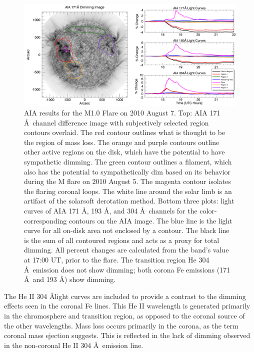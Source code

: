 \begin{figure}[!h]
	\caption[AIA contour analysis for 2010 August 7 event]{
        AIA results for the M1.0 Flare on 2010 August 7. Top: AIA 171 \AA\ channel difference image with subjectively 
        selected region contours overlaid. The red contour outlines what is thought to be the region of mass loss. The 
        orange and purple contours outline other active regions on the disk, which have the potential to have sympathetic 
        dimming. The green contour outlines a filament, which also has the potential to sympathetically dim based on its 
        behavior during the M flare on 2010 August 5. The magenta contour isolates the flaring coronal loops. The white line 
        around the solar limb is an artifact of the solarsoft derotation method. Bottom three plots: light curves of AIA 171 
        \AA, 193 \AA, and 304 \AA\ channels for the color-corresponding contours on the AIA image. The blue line is the 
        light curve for all on-disk area not enclosed by a contour. The black line is the sum of all contoured regions and 
        acts as a proxy for total dimming. All percent changes are calculated from the band’s value at 17:00 UT, prior to 
        the flare. The transition region He 304 \AA\ emission does not show dimming; both corona Fe emissions (171 \AA\ and 
        193 \AA) show dimming.
	}
    \begin{center}
	    \includegraphics[width=166mm]{Images/Aia2010Aug7.png}
    \end{center}
    \label{aia2010aug7}
\end{figure}

The He II 304 \AA light curves are included to provide a contrast to the dimming effects seen in the coronal Fe lines. This He II wavelength is generated primarily in the chromosphere and transition region, as opposed to the coronal source of the other wavelengths. Mass loss occurs primarily in the corona, as the term coronal mass ejection suggests. This is reflected in the lack of dimming observed in the non-coronal He II 304 \AA\ emission line.

